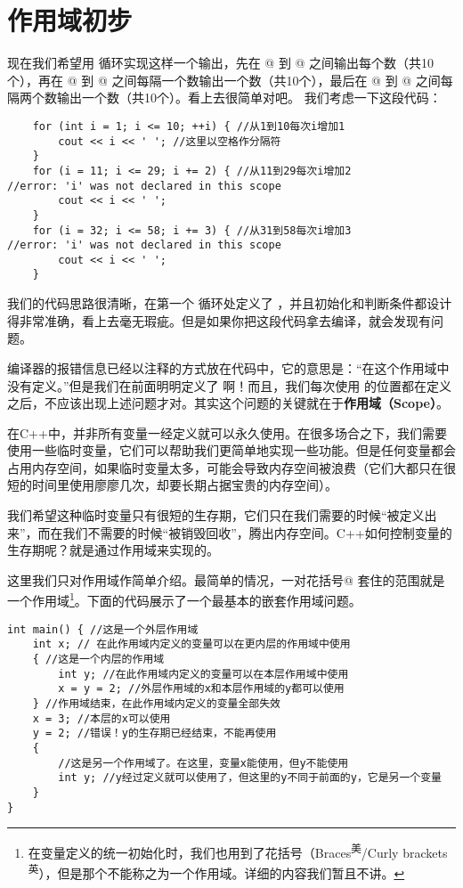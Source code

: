 \section{作用域初步}
现在我们希望用 \lstinline@for@ 循环实现这样一个输出，先在 @ 到 @ 之间输出每个数（共10个），再在 @ 到 @ 之间每隔一个数输出一个数（共10个），最后在 @ 到 @ 之间每隔两个数输出一个数（共10个）。看上去很简单对吧。
我们考虑一下这段代码：
\begin{lstlisting}
    for (int i = 1; i <= 10; ++i) { //从1到10每次i增加1
    	cout << i << ' '; //这里以空格作分隔符
    }
    for (i = 11; i <= 29; i += 2) { //从11到29每次i增加2
//error: 'i' was not declared in this scope
    	cout << i << ' ';
    }
    for (i = 32; i <= 58; i += 3) { //从31到58每次i增加3
//error: 'i' was not declared in this scope
    	cout << i << ' ';
    }
\end{lstlisting}
我们的代码思路很清晰，在第一个 \lstinline@for@ 循环处定义了 \lstinline@i@，并且初始化和判断条件都设计得非常准确，看上去毫无瑕疵。但是如果你把这段代码拿去编译，就会发现有问题。\par
编译器的报错信息已经以注释的方式放在代码中，它的意思是：``\lstinline@i@ 在这个作用域中没有定义。''但是我们在前面明明定义了 \lstinline@i@ 啊！而且，我们每次使用 \lstinline@i@ 的位置都在定义之后，不应该出现上述问题才对。其实这个问题的关键就在于\textbf{作用域（Scope）}。\par
在C++中，并非所有变量一经定义就可以永久使用。在很多场合之下，我们需要使用一些临时变量，它们可以帮助我们更简单地实现一些功能。但是任何变量都会占用内存空间，如果临时变量太多，可能会导致内存空间被浪费（它们大都只在很短的时间里使用廖廖几次，却要长期占据宝贵的内存空间）。\par
我们希望这种临时变量只有很短的生存期，它们只在我们需要的时候``被定义出来''，而在我们不需要的时候``被销毁回收''，腾出内存空间。C++如何控制变量的生存期呢？就是通过作用域来实现的。\par
这里我们只对作用域作简单介绍。最简单的情况，一对花括号\lstinline@{}@ 套住的范围就是一个作用域\footnote{在变量定义的统一初始化时，我们也用到了花括号（Braces\textsuperscript{美}/Curly brackets\textsuperscript{英}），但是那个不能称之为一个作用域。详细的内容我们暂且不讲。}。下面的代码展示了一个最基本的嵌套作用域问题。
\begin{lstlisting}
int main() { //这是一个外层作用域
    int x; // 在此作用域内定义的变量可以在更内层的作用域中使用
    { //这是一个内层的作用域
        int y; //在此作用域内定义的变量可以在本层作用域中使用
        x = y = 2; //外层作用域的x和本层作用域的y都可以使用
    } //作用域结束，在此作用域内定义的变量全部失效
    x = 3; //本层的x可以使用
    y = 2; //错误！y的生存期已经结束，不能再使用
    {
        //这是另一个作用域了。在这里，变量x能使用，但y不能使用
        int y; //y经过定义就可以使用了，但这里的y不同于前面的y，它是另一个变量
    }
}
\end{lstlisting}\par
